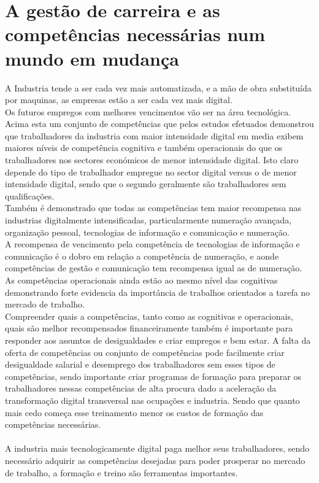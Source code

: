 \section{A gestão de carreira e as competências necessárias num mundo em mudança}
\qquad A Industria tende a ser cada vez mais automatizada, e a mão de obra substituída por maquinas, as empresas estão a ser cada vez mais digital.\\
Os futuros empregos com melhores vencimentos vão ser na área tecnológica.\\

Acima esta um conjunto de competências que pelos estudos efetuados demonstrou que trabalhadores da industria com maior intensidade digital em media exibem maiores níveis de competência cognitiva e também operacionais do que os trabalhadores nos sectores económicos de menor intensidade digital. Isto claro depende do tipo de trabalhador empregue no sector digital versus o de menor intensidade digital, sendo que o segundo geralmente são trabalhadores sem qualificações.\cite{article_1}\\
Também é demonstrado que todas as competências tem maior recompensa nas industrias digitalmente intensificadas, particularmente numeração avançada, organização pessoal, tecnologias de informação e comunicação e numeração.\cite{article_1}\\
A recompensa de vencimento pela competência de tecnologias de informação e comunicação é o dobro em relação a competência de numeração, e aonde competências de gestão e comunicação tem recompensa igual as de numeração.\cite{article_1}\\
As competências operacionais ainda estão ao mesmo nível das cognitivas demonstrando forte evidencia da importância de trabalhos orientados a tarefa no mercado de trabalho.\cite{article_1}\\
Compreender quais a competências, tanto como as cognitivas e operacionais, quais são melhor recompensados financeiramente também é importante para responder aos assuntos de  desigualdades e criar empregos e bem estar. A falta da oferta de competências ou conjunto de competências pode facilmente criar desigualdade salarial e desemprego dos trabalhadores sem esses tipos de competências, sendo importante criar programas de formação para preparar os trabalhadores nessas competências de alta procura dado a aceleração da transformação digital transversal nas ocupações e industria. Sendo que quanto mais cedo começa esse treinamento menor os custos de formação das competências necessárias.\cite{article_1}\\
\\
A industria mais tecnologicamente digital paga melhor seus trabalhadores, sendo necessário adquirir as competências desejadas para poder prosperar no mercado de trabalho, a formação e treino são ferramentas importantes.
